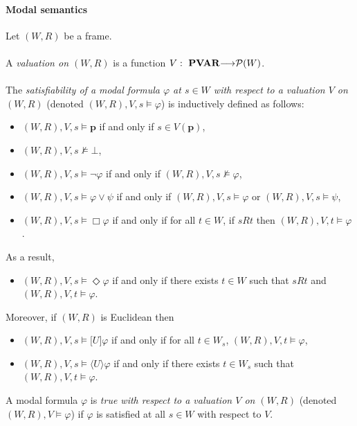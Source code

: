\documentclass[draft]{article}
\def\PVAR{\mathbf{PVAR}}
\begin{document}
\paragraph{Modal semantics}
%
%
Let $(W,R)$ be a frame.
%
%
\\
\\
%
%
A {\it valuation on $(W,R)$}\/ is a function $V:\ \PVAR{\longrightarrow}{\cal P}(W)$.
%
%
\\
\\
%
%
The {\it satisfiability of a modal formula $\varphi$ at $s{\in}W$ with respect to a valuation $V$ on $(W,R)$}\/ (denoted $(W,R),V,s{\models}\varphi$) is inductively defined as follows:
%
%
\begin{itemize}
%
%
\item $(W,R),V,s{\models}\mathbf{p}$ if and only if $s{\in}V(\mathbf{p})$,
%
%
\item $(W,R),V,s{\not\models}\bot$,
%
%
\item $(W,R),V,s{\models}\neg\varphi$ if and only if $(W,R),V,s{\not\models}\varphi$,
%
%
\item $(W,R),V,s{\models}\varphi\vee\psi$ if and only if $(W,R),V,s{\models}\varphi$ or $(W,R),V,s{\models}\psi$,
%
%
\item $(W,R),V,s{\models}\Box\varphi$ if and only if for all $t{\in}W$, if $s{R}t$ then $(W,R),V,t{\models}\varphi$.
%
%
\end{itemize}
%
%
As a result,
%
%
\begin{itemize}
%
%
\item $(W,R),V,s{\models}\Diamond\varphi$ if and only if there exists $t{\in}W$ such that $s{R}t$ and $(W,R),
%
%
%
%
%
%
%
%
%
%
%
%
$\linebreak$
%
%
%
%
%
%
%
%
%
%
%
%
V,t{\models}\varphi$.
%
%
\end{itemize}
%
%
Moreover, if $(W,R)$ is Euclidean then
%
%
\begin{itemize}
%
%
\item $(W,R),V,s{\models}\lbrack U\rbrack\varphi$ if and only if for all $t{\in}W_{s}$, $(W,R),V,t{\models}\varphi$,
%
%
\item $(W,R),V,s{\models}\langle U\rangle\varphi$ if and only if there exists $t{\in}W_{s}$ such that $(W,R),V,t{\models}
%
%
%
%
%
%
%
%
%
%
%
%
$\linebreak$
%
%
%
%
%
%
%
%
%
%
%
%
\varphi$.
%
%
\end{itemize}
%
%
A modal formula $\varphi$ is {\it true with respect to a valuation $V$ on $(W,R)$}\/ (denoted $(W,R),V{\models}\varphi$) if $\varphi$ is satisfied at all $s{\in}W$ with respect to $V$.
\end{document}
